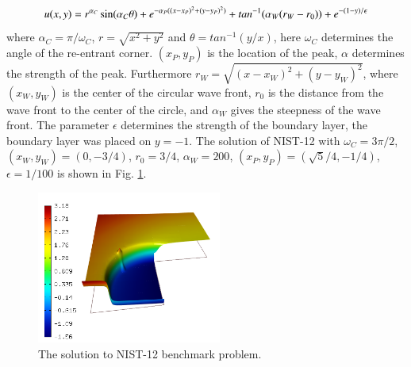 \documentclass[12pt]{elsarticle}
\begin{document}
\[
u(x,y) =  r^{\alpha_{C} }\sin(\alpha_{C} \theta)
+ e^{-\alpha_{P} ((x - x_{P})^{2} + (y - y_{P})^{2})}
+ tan^{-1}(\alpha_{W} (r_{W} - r_{0})) \\
+ e^{-(1 - y) / \epsilon}
\]
where $\alpha_C = \pi / \omega_C$, $r = \sqrt{x^2+y^2}$
and $\theta = tan^{-1}(y/x)$, here $\omega_C$ determines
the angle of the re-entrant corner.
$(x_{P}, y_{P})$ is the location of the peak, $\alpha$
determines the strength of the peak. Furthermore
$r_{W} = \sqrt{(x - x_{W})^{2} + (y - y_{W})^{2}}$,
where $(x_{W}, y_{W})$ is the center of the circular wave front,
$r_{0}$ is the distance from the wave front to the
center of the circle, and $\alpha_W$ gives
the steepness of the wave front. The parameter $\epsilon$ determines the
strength of the boundary layer, the boundary layer was placed on $y = -1$.
The solution of NIST-12 with $\omega_C = 3 \pi /2$,
$(x_{W}, y_{W}) = (0, -3/4)$, $r_{0} = 3/4$, $\alpha_{W} = 200$,
$(x_{P}, y_{P}) = (\sqrt{5} / 4, -1/4)$,
$\epsilon = 1/100$ is shown in Fig. \ref{fig:sln-nist12}.

\begin{figure}[H]
\centering
\includegraphics[height=5cm]{nist/nist-12/solution.png}
\caption{The solution to NIST-12 benchmark problem.}
\label{fig:sln-nist12}
\end{figure}
\end{document}
